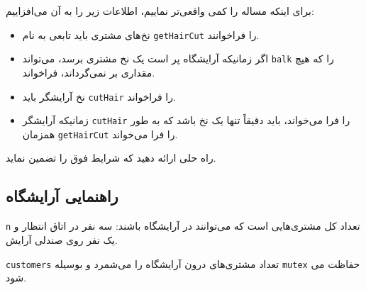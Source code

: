 \documentclass{book}
\newcommand{\clearemptydoublepage}{\newpage\cleardoublepage}
\begin{document}
    برای اینکه مساله را کمی واقعی‌تر نماییم، اطلاعات زیر را به آن می‌افزاییم: 

\begin{itemize}

\item %
    نخ‌های مشتری باید تابعی به نام {\tt getHairCut} را فراخوانند. 

\item 
    اگر زمانیکه آرایشگاه پر است یک نخ مشتری برسد، می‌تواند {\tt balk} را که هیچ مقداری بر نمی‌گرداند،  فراخواند. 

\item %
    نخ آرایشگر باید {\tt cutHair} را فراخواند. 

\item 
    زمانیکه آرایشگر {\tt cutHair} را فرا می‌خواند،‌ باید دقیقاً تنها یک نخ باشد که به طور همزمان  {\tt getHairCut} را فرا می‌خواند. 

\end{itemize}

    راه حلی ارائه دهید  که شرایط فوق را تضمین نماید. 


\clearemptydoublepage
\subsection{راهنمایی آرایشگاه}

\begin{latin}
%

\end{latin}

    {\tt n}    تعداد کل مشتری‌هایی است که می‌توانند در آرایشگاه باشند: سه نفر در اتاق انتظار و یک نفر روی صندلی آرایش. 

    {\tt customers}        تعداد مشتری‌های درون آرایشگاه را می‌شمرد و بوسیله  {\tt mutex} حفاظت می‌ شود. 
    
\end{document}
